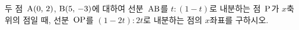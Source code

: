 두 점~$\mathrm{A}(0,\,2)$, $\mathrm{B}(5,\,-3)$에 대하여 선분~$\mathrm{AB}$를 $t:(1-t)$로 내분하는 점~$\mathrm{P}$가 $x$축 위의 점일 때, 선분~$\mathrm{OP}$를 $(1-2t):2t$로 내분하는 점의 $x$좌표를 구하시오. 
